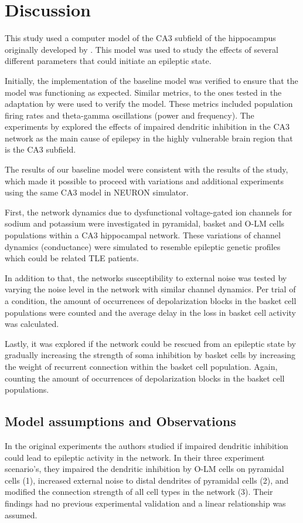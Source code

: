 \chapter{Discussion}\label{ch:discussion}
This study used a computer model of the CA3 subfield of the hippocampus originally developed by \textcite{neymotinKetamineDisruptsTheta2011}.
This model was used to study the effects of several different parameters that could initiate an epileptic state.

Initially, the implementation of the baseline model was verified to ensure that the model was functioning as expected.
Similar metrics, to the ones tested in the adaptation by \textcite{sanjayImpairedDendriticInhibition2015} were used to verify the model.
These metrics included population firing rates and theta-gamma oscillations (power and frequency).
The experiments by \textcite{sanjayImpairedDendriticInhibition2015} explored the effects of impaired dendritic inhibition in the CA3 network
as the main cause of epilepsy in the highly vulnerable brain region that is the CA3 subfield.

The results of our baseline model were consistent with the results of the \textcite{sanjayImpairedDendriticInhibition2015} study,
which made it possible to proceed with variations and additional experiments using the same CA3 model in NEURON simulator.

First, the network dynamics due to dysfunctional voltage-gated ion channels for sodium and potassium
were investigated in pyramidal, basket and O-LM cells populations within a CA3 hippocampal network.
These variations of channel dynamics (conductance) were simulated to resemble epileptic genetic profiles which could be related TLE patients.

In addition to that, the networks susceptibility to external noise was tested by varying the noise level in the network with similar channel dynamics.
Per trial of a condition, the amount of occurrences of depolarization blocks in the basket cell populations were counted and the average delay in the
loss in basket cell activity was calculated.

Lastly, it was explored if the network could be rescued from an epileptic state by gradually increasing the strength of soma inhibition by basket cells
by increasing the weight of recurrent connection within the basket cell population. Again, counting the amount of occurrences of depolarization blocks
in the basket cell populations.
\pagebreak

\section{Model assumptions and Observations}
In the original experiments \textcite{sanjayImpairedDendriticInhibition2015} the authors studied if impaired dendritic
inhibition could lead to epileptic activity in the network.
In their three experiment scenario's, they impaired the dendritic inhibition by O-LM cells on pyramidal cells (1), increased external noise to distal
dendrites of pyramidal cells (2), and modified the connection strength of all cell types in the network (3).
Their findings had no previous experimental validation and a linear relationship was assumed.

